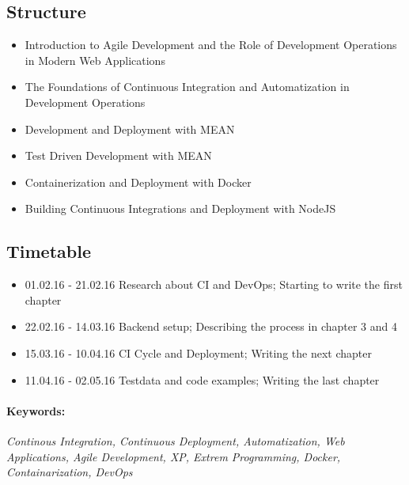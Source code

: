 \subsection{Structure}
\begin{itemize}
\item Introduction to Agile Development and the Role of Development Operations in Modern Web Applications
\item The Foundations of Continuous Integration and Automatization in Development Operations
\item Development and Deployment with MEAN
\item Test Driven Development with MEAN
\item Containerization and Deployment with Docker
\item Building Continuous Integrations and Deployment with NodeJS
\end{itemize}

\subsection{Timetable}
\begin{itemize}
  \item 01.02.16 - 21.02.16 Research about CI and DevOps; Starting to write the first chapter
  \item 22.02.16 - 14.03.16 Backend setup; Describing the process in chapter 3 and 4
  \item 15.03.16 - 10.04.16 CI Cycle and Deployment; Writing the next chapter
  \item 11.04.16 - 02.05.16 Testdata and code examples; Writing the last chapter
\end{itemize}

\paragraph{Keywords:}
\textit{Continous Integration, Continuous Deployment, Automatization, Web Applications, Agile Development, XP, Extrem Programming, Docker, Containarization, DevOps }

